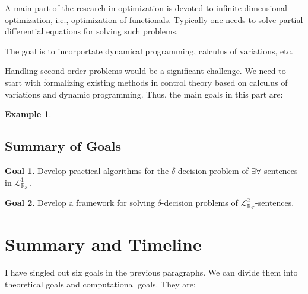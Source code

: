 \documentclass[10pt]{article}
\newcommand{\lrf}{\mathcal{L}_{\mathbb{R}_{\mathcal{F}}}}
\theoremstyle{definition}
\newtheorem{example}{Example}[section]
\newtheorem{goal}{Goal}
\begin{document}
A main part of the research in optimization is devoted to infinite dimensional optimization, i.e., optimization of functionals. Typically one needs to solve partial differential equations for solving such problems. 

The goal is to incorportate dynamical programming, calculus of variations, etc. 


Handling second-order problems would be a significant challenge. We need to start with formalizing existing methods in control theory based on calculus of variations and dynamic programming. Thus, the main goals in this part are:

\begin{example}

\end{example}



\subsection{Summary of Goals}

\begin{goal}
Develop practical algorithms for the $\delta$-decision problem of $\exists\forall$-sentences in $\lrf^1$.
\end{goal}
\begin{goal}
Develop a framework for solving $\delta$-decision problems of $\lrf^2$-sentences.
\end{goal}



\newpage
\section{Summary and Timeline}

I have singled out six goals in the previous paragraphs. We can divide them into theoretical goals and computational goals. They are:
\end{document}
